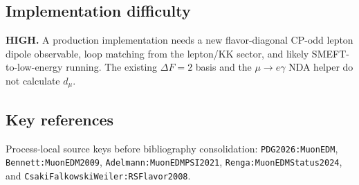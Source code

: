 \subsection*{Implementation difficulty}
\textbf{HIGH.}  A production implementation needs a new flavor-diagonal
CP-odd lepton dipole observable, loop matching from the lepton/KK sector, and
likely SMEFT-to-low-energy running.  The existing \(\Delta F=2\) basis and the
\(\mu\to e\gamma\) NDA helper do not calculate \(d_\mu\).

\subsection*{Key references}
Process-local source keys before bibliography consolidation:
\texttt{PDG2026:MuonEDM}, \texttt{Bennett:MuonEDM2009},
\texttt{Adelmann:MuonEDMPSI2021}, \texttt{Renga:MuonEDMStatus2024}, and
\texttt{CsakiFalkowskiWeiler:RSFlavor2008}.

